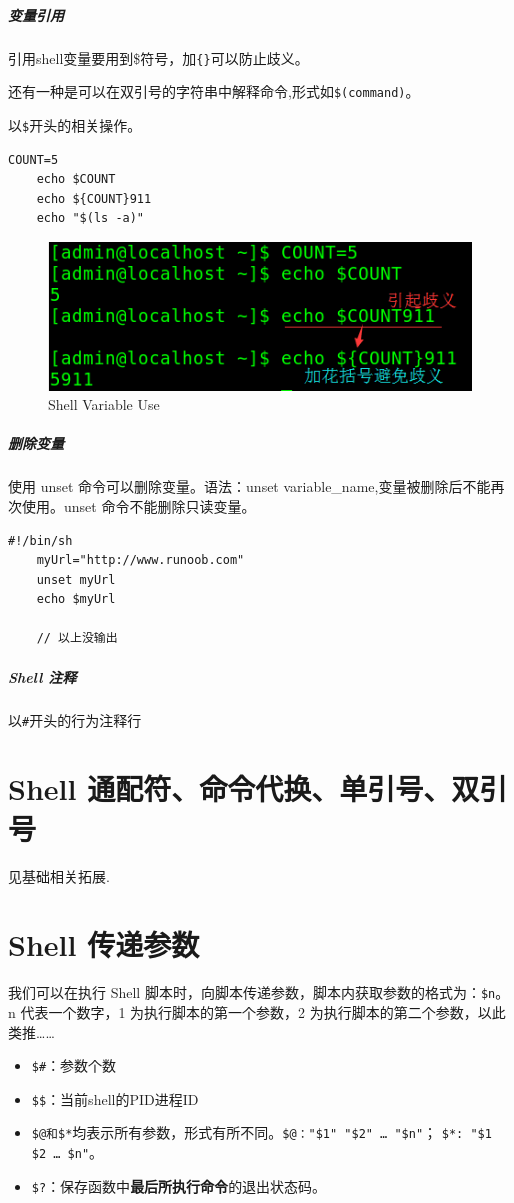 \documentclass[UTF8,a4paper,12pt]{ctexbook}
\begin{document}
			\subparagraph{变量引用}引用shell变量要用到\$符号，加\verb|{}|可以防止歧义。
			
				还有一种是可以在双引号的字符串中解释命令,形式如\verb|$(command)|。
				
				以\verb|$|开头的相关操作。
				\begin{lstlisting}[frame=L,xleftmargin=.06\textwidth]
	COUNT=5
	echo $COUNT
	echo ${COUNT}911
	echo "$(ls -a)"
				\end{lstlisting}
			
				\begin{figure}[h]
					\centering
					\includegraphics[scale = 0.7]{figure/ShellRefVariable.png}
					\caption{Shell Variable Use}
				\end{figure}
									
			\subparagraph{删除变量}
				使用 unset 命令可以删除变量。语法：unset variable\_name,变量被删除后不能再次使用。unset 命令不能删除只读变量。
				\begin{lstlisting}[frame=L,xleftmargin=.06\textwidth]
	#!/bin/sh
	myUrl="http://www.runoob.com"
	unset myUrl
	echo $myUrl
	
	// 以上没输出
					\end{lstlisting}
					

				\subparagraph{Shell 注释}
					以\verb|#|开头的行为注释行
				
				
		 \section{Shell 通配符、命令代换、单引号、双引号}
			 见基础相关拓展.
	 
		 \section{Shell 传递参数}
			 我们可以在执行 Shell 脚本时，向脚本传递参数，脚本内获取参数的格式为：\verb|$n|。n 代表一个数字，1 为执行脚本的第一个参数，2 为执行脚本的第二个参数，以此类推……
			 
			 \begin{itemize}
			 	\item  \verb|$#|：参数个数
			 	\item  \verb|$$|：当前shell的PID进程ID
			 	\item  \verb|$@和$*|均表示所有参数，形式有所不同。\verb|$@："$1" "$2" … "$n"|； \verb|$*: "$1 $2 … $n"|。
			 	\item  \verb|$?|：保存函数中\textbf{最后所执行命令}的退出状态码。
			 \end{itemize}
			 
\end{document}
